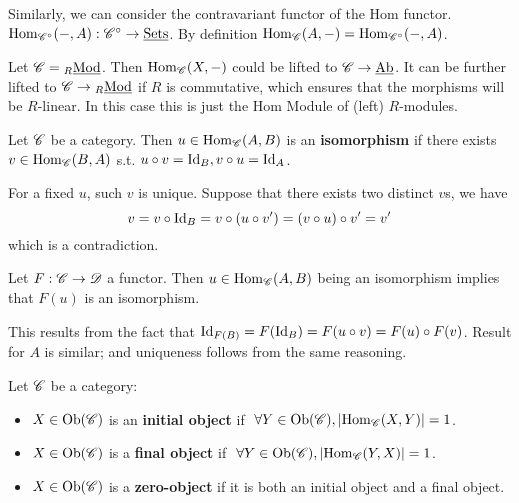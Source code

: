 \begin{remark}
    Similarly, we can consider the contravariant functor of the Hom functor. $\mathrm{Hom}_{\mathscr{C}^{\circ}}(-, A) : \mathscr{C}^{\circ} \to \underline{\textup{Sets}}$. By definition $\mathrm{Hom}_{\mathscr{C}}(A, -) = \mathrm{Hom}_{\mathscr{C}^{\circ}}(-, A)$.
\end{remark}

\begin{remark}
    Let $\mathscr{C} = {}_{R}\underline{\textup{Mod}}$. Then $\mathrm{Hom}_{\mathscr{C}}(X, -)$ could be lifted to $\mathscr{C} \to \underline{\textup{Ab}}$. It can be further lifted to $\mathscr{C} \to {}_{R}\underline{\textup{Mod}}$ if $R$ is commutative, which ensures that the morphisms will be $R$-linear. In this case this is just the Hom Module of (left) $R$-modules. 
\end{remark}

\begin{definition}
    Let $\mathscr{C}$ be a category. Then $u\in \mathrm{Hom}_{\mathscr{C}}(A, B)$ is an \textbf{isomorphism} if there exists $v \in \mathrm{Hom}_{\mathscr{C}}(B, A)$ s.t. $u\circ v = \mathrm{Id}_B, v\circ u = \mathrm{Id}_A$.
\end{definition}

\begin{remark}
    For a fixed $u$, such $v$ is unique. Suppose that there exists two distinct $v$s, we have
    \[
        v = v \circ \mathrm{Id}_B = v \circ (u \circ v') = (v \circ u) \circ v' = v'
    \]
    which is a contradiction.
\end{remark}

\begin{remark}
    Let $F: \mathscr{C} \to \mathscr{D}$ a functor. Then $u\in \mathrm{Hom}_{\mathscr{C}} (A, B)$ being an isomorphism implies that $F(u)$ is an isomorphism.

    This results from the fact that $\mathrm{Id}_{F(B)} = F(\mathrm{Id}_B) = F(u \circ v) = F(u) \circ F(v)$. Result for $A$ is similar; and uniqueness follows from the same reasoning. 
\end{remark}

\begin{definition}
    Let $\mathscr{C}$ be a category:
    \begin{itemize}
        \item $X \in \mathrm{Ob}(\mathscr{C})$ is an \textbf{initial object} if $\ \forall Y \in \mathrm{Ob}(\mathscr{C}), \left|\mathrm{Hom}_{\mathscr{C}}(X, Y)\right| = 1$.
        \item $X \in \mathrm{Ob}(\mathscr{C})$ is a \textbf{final object} if $\ \forall Y \in \mathrm{Ob}(\mathscr{C}), \left|\mathrm{Hom}_{\mathscr{C}}(Y, X)\right| = 1$.
        \item $X \in \mathrm{Ob}(\mathscr{C})$ is a \textbf{zero-object} if it is both an initial object and a final object. 
    \end{itemize} 
\end{definition}

